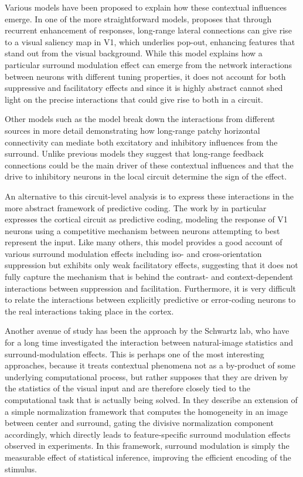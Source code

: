 Various models have been proposed to explain how these contextual
influences emerge. In one of the more straightforward models,
\cite{Li2002} proposes that through recurrent enhancement of
responses, long-range lateral connections can give rise to a visual
saliency map in V1, which underlies pop-out, enhancing features that
stand out from the visual background. While this model explains how a
particular surround modulation effect can emerge from the network
interactions between neurons with different tuning properties, it does
not account for both suppressive and facilitatory effects and since it
is highly abstract cannot shed light on the precise interactions that
could give rise to both in a circuit.

Other models such as the \cite{Schwabe2006} model break down the
interactions from different sources in more detail demonstrating how
long-range patchy horizontal connectivity can mediate both excitatory
and inhibitory influences from the surround. Unlike previous models
they suggest that long-range feedback connections could be the main
driver of these contextual influences and that the drive to inhibitory
neurons in the local circuit determine the sign of the effect.

An alternative to this circuit-level analysis is to express these
interactions in the more abstract framework of predictive coding. The
work by \cite{Spratling2010} in particular expresses the cortical
circuit as predictive coding, modeling the response of V1 neurons
using a competitive mechanism between neurons attempting to best
represent the input. Like many others, this model provides a good
account of various surround modulation effects including iso- and
cross-orientation suppression but exhibits only weak facilitatory
effects, suggesting that it does not fully capture the mechanism that
is behind the contrast- and context-dependent interactions between
suppression and facilitation. Furthermore, it is very difficult to
relate the interactions between explicitly predictive or error-coding
neurons to the real interactions taking place in the cortex.

Another avenue of study has been the approach by the Schwartz lab, who
have for a long time investigated the interaction between
natural-image statistics and surround-modulation effects. This is
perhaps one of the most interesting approaches, because it treats
contextual phenomena not as a by-product of some underlying
computational process, but rather supposes that they are driven by the
statistics of the visual input and are therefore closely tied to the
computational task that is actually being solved. In \cite{Coen2015}
they describe an extension of a simple normalization framework that
computes the homogeneity in an image between center and surround,
gating the divisive normalization component accordingly, which
directly leads to feature-specific surround modulation effects
observed in experiments. In this framework, surround modulation is
simply the measurable effect of statistical inference, improving the
efficient encoding of the stimulus.

